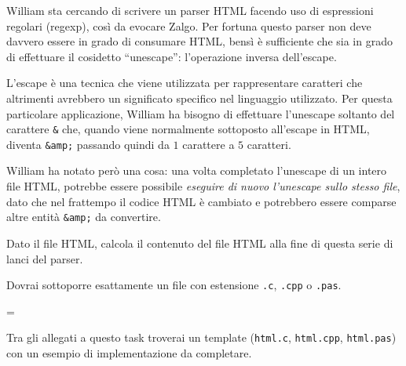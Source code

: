 \usepackage{xcolor}
\usepackage{afterpage}
\usepackage{pifont,mdframed}
\usepackage[bottom]{footmisc}

\makeatletter
\gdef\this@inputfilename{input.txt}
\gdef\this@outputfilename{output.txt}
\makeatother

\newcommand{\inputfile}{\texttt{input.txt}}
\newcommand{\outputfile}{\texttt{output.txt}}

\newenvironment{warning}
  {\par\begin{mdframed}[linewidth=2pt,linecolor=gray]%
    \begin{list}{}{\leftmargin=1cm
                   \labelwidth=\leftmargin}\item[\Large\ding{43}]}
  {\end{list}\end{mdframed}\par}

William sta cercando di scrivere un parser HTML facendo uso di espressioni regolari (regexp), così da evocare Zalgo. Per fortuna questo parser non deve davvero essere in grado di consumare HTML, bensì è sufficiente che sia in grado di effettuare il cosidetto ``unescape'': l'operazione inversa dell'escape.

L'escape è una tecnica che viene utilizzata per rappresentare caratteri che altrimenti avrebbero un significato specifico nel linguaggio utilizzato. Per questa particolare applicazione, William ha bisogno di effettuare l'unescape soltanto del carattere \texttt{\&} che, quando viene normalmente sottoposto all'escape in HTML, diventa \texttt{\&amp;} passando quindi da $1$ carattere a $5$ caratteri.

William ha notato però una cosa: una volta completato l'unescape di un intero file HTML, potrebbe essere possibile \emph{eseguire di nuovo l'unescape sullo stesso file}, dato che nel frattempo il codice HTML è cambiato e potrebbero essere comparse altre entità \texttt{\&amp;} da convertire.

Dato il file HTML, calcola il contenuto del file HTML alla fine di questa serie di lanci del parser.

\Implementation
Dovrai sottoporre esattamente un file con estensione \texttt{.c}, \texttt{.cpp} o \texttt{.pas}.

\begin{warning}
Tra gli allegati a questo task troverai un template (\texttt{html.c}, \texttt{html.cpp}, \texttt{html.pas}) con un esempio di implementazione da completare.
\end{warning}

